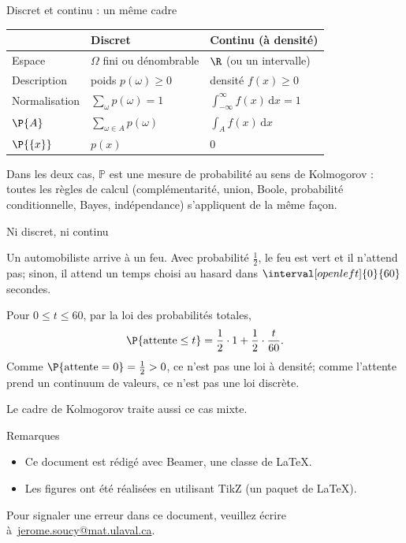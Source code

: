 \documentclass[nuit,charter,pied]{BeamerJS}
\begin{document}
\begin{frame}{Discret et continu : un même cadre}
\pause
	\begin{center}
	{\small
	\begin{tabular}{|l|l|l|}
		\hline
		 & \textbf{Discret} & \textbf{Continu (à densité)} \\ \hline
		Espace & \(\Omega\) fini ou dénombrable & \(\R\) (ou un intervalle) \\ \hline
		Description & poids \(p(\omega)\geq 0\) & densité \(f(x)\geq 0\) \\ \hline
		Normalisation & \(\sum_{\omega}p(\omega)=1\) & \(\int_{-\infty}^{\infty}f(x)\,\mathrm{d}x=1\) \\ \hline
		\(\P{A}\) & \(\sum_{\omega\in A}p(\omega)\) & \(\int_A f(x)\,\mathrm{d}x\) \\ \hline
		\(\P{\{x\}}\) & \(p(x)\) & \(0\) \\ \hline
	\end{tabular}
	}
	\end{center}
	\pause
	\begin{lumiere}
		Dans les deux cas, \(\mathbb{P}\) est une mesure de probabilité au sens de Kolmogorov : toutes les règles de calcul (complémentarité, union, Boole, probabilité conditionnelle, Bayes, indépendance) s'appliquent de la même façon.
	\end{lumiere}
\end{frame}

\begin{frame}[t]{Ni discret, ni continu}
\pause
	\begin{ex}
		Un automobiliste arrive à un feu. Avec probabilité \(\frac{1}{2}\), le feu est vert et il n'attend pas; sinon, il attend un temps choisi au hasard dans \(\interval[open left]{0}{60}\) secondes.
	\end{ex}
	\pause
	Pour \(0\leq t\leq 60\), par la loi des probabilités totales,
	\[\P{\text{attente}\leq t}=\frac{1}{2}\cdot 1+\frac{1}{2}\cdot\frac{t}{60}.\]
	\pause
	Comme \(\P{\text{attente}=0}=\frac{1}{2}>0\), ce n'est pas une loi à densité; \pause comme l'attente prend un continuum de valeurs, ce n'est pas une loi discrète.
	\pause
	\begin{lumiere}
		Le cadre de Kolmogorov traite aussi ce cas mixte.
	\end{lumiere}
\end{frame}

\begin{frame}{Remarques}
\begin{rems}
	\begin{itemize}
		\item Ce document est rédigé avec Beamer, une classe de \LaTeX.
		\item Les figures ont été réalisées en utilisant TikZ (un paquet de \LaTeX).
	\end{itemize}
\end{rems}
	\vfill
	\footnotesize Pour signaler une erreur dans ce document, veuillez écrire à~\href{mailto:jerome.soucy@mat.ulaval.ca}{jerome.soucy@mat.ulaval.ca}.
\end{frame}
\end{document}
